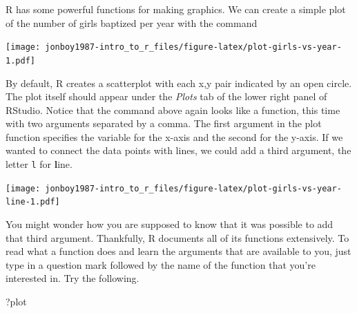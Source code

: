 \documentclass[]{article}
\newenvironment{Shaded}{\begin{snugshade}}{\end{snugshade}}
\newcommand{\KeywordTok}[1]{\textcolor[rgb]{0.13,0.29,0.53}{\textbf{#1}}}
\newcommand{\DataTypeTok}[1]{\textcolor[rgb]{0.13,0.29,0.53}{#1}}
\newcommand{\StringTok}[1]{\textcolor[rgb]{0.31,0.60,0.02}{#1}}
\newcommand{\OperatorTok}[1]{\textcolor[rgb]{0.81,0.36,0.00}{\textbf{#1}}}
\newcommand{\NormalTok}[1]{#1}
\begin{document}
R has some powerful functions for making graphics. We can create a
simple plot of the number of girls baptized per year with the command

\begin{Shaded}
\end{Shaded}

\texttt{[image: jonboy1987-intro\_to\_r\_files/figure-latex/plot-girls-vs-year-1.pdf]}

By default, R creates a scatterplot with each x,y pair indicated by an
open circle. The plot itself should appear under the \emph{Plots} tab of
the lower right panel of RStudio. Notice that the command above again
looks like a function, this time with two arguments separated by a
comma. The first argument in the plot function specifies the variable
for the x-axis and the second for the y-axis. If we wanted to connect
the data points with lines, we could add a third argument, the letter
\texttt{l} for \textbf{l}ine.

\begin{Shaded}
\end{Shaded}

\texttt{[image: jonboy1987-intro\_to\_r\_files/figure-latex/plot-girls-vs-year-line-1.pdf]}

You might wonder how you are supposed to know that it was possible to
add that third argument. Thankfully, R documents all of its functions
extensively. To read what a function does and learn the arguments that
are available to you, just type in a question mark followed by the name
of the function that you're interested in. Try the following.

\begin{Shaded}
\begin{Highlighting}[]
\NormalTok{?plot}
\end{Highlighting}
\end{Shaded}
\end{document}
